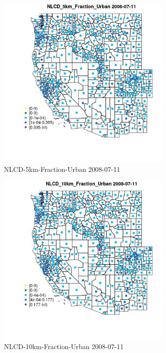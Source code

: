 \begin{figure} 
\centering  
\includegraphics[width=0.77\textwidth]{Code_Outputs/df_report_ML_predictors_CountyCentroid_Locations_Dates_2008-01-01to2018-12-31_MapObsNLCD_5km_Fraction_Urban2008-07-11.jpg} 
\caption{\label{fig:df_report_ML_predictors_CountyCentroid_Locations_Dates_2008-01-01to2018-12-31MapObsNLCD_5km_Fraction_Urban2008-07-11}NLCD-5km-Fraction-Urban 2008-07-11} 
\end{figure} 
 

\begin{figure} 
\centering  
\includegraphics[width=0.77\textwidth]{Code_Outputs/df_report_ML_predictors_CountyCentroid_Locations_Dates_2008-01-01to2018-12-31_MapObsNLCD_10km_Fraction_Urban2008-07-11.jpg} 
\caption{\label{fig:df_report_ML_predictors_CountyCentroid_Locations_Dates_2008-01-01to2018-12-31MapObsNLCD_10km_Fraction_Urban2008-07-11}NLCD-10km-Fraction-Urban 2008-07-11} 
\end{figure} 
 

